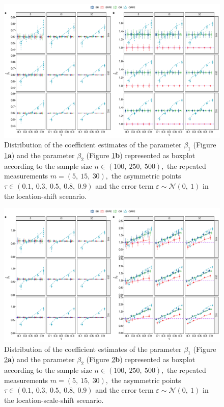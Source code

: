 \documentclass[15pt,a4paper]{article}
\begin{document}
\begin{figure}[H]
\centering
\includegraphics[width=0.8\linewidth]{Graph_main/gnorm1_erfe}
 \caption{Distribution of the coefficient estimates of the parameter $\beta_1$ (Figure \ref{fig:gnorm1_erfe}\textbf{a}) and the parameter $\beta_2$ (Figure \ref{fig:gnorm1_erfe}\textbf{b}) represented as boxplot according to the sample size $n\in(100,  \ 250,  \ 500),$ the repeated measurements $m=(5,\ 15,\ 30),$ the asymmetric points $\tau\in (0.1,  \ 0.3,  \  0.5, \  0.8,\ 0.9)$ and the error term $\varepsilon\sim\mathcal{N}(0, \ 1)$ in the location-shift scenario.}\label{fig:gnorm1_erfe}
\end{figure}

\begin{figure}[H]
\centering
\includegraphics[width=0.8\linewidth]{Graph_main/gnorm2_erfe}
 \caption{Distribution of the coefficient estimates of the parameter $\beta_1$ (Figure \ref{fig:gnorm2_erfe}\textbf{a}) and the parameter $\beta_2$ (Figure \ref{fig:gnorm2_erfe}\textbf{b}) represented as boxplot according to the sample size $n\in(100,  \ 250,  \ 500),$ the repeated measurements $m=(5,\ 15,\ 30),$ the asymmetric points $\tau\in (0.1,  \ 0.3,  \  0.5, \  0.8,\ 0.9)$ and the error term $\varepsilon\sim\mathcal{N}(0, \ 1)$ in the location-scale-shift scenario.}\label{fig:gnorm2_erfe}
\end{figure}
\end{document}
